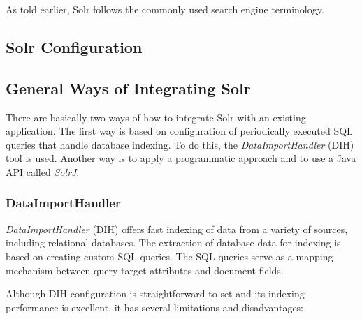 As told earlier, Solr follows the commonly used search engine terminology. 


\subsection{Solr Configuration}


\subsection{General Ways of Integrating Solr}

There are basically two ways of how to integrate Solr with an existing application. The first way is based on configuration of periodically executed SQL queries that handle database indexing. To do this, the \textit{DataImportHandler} (DIH) tool is used. Another way is to apply a programmatic approach and to use a Java API called \textit{SolrJ}.



\subsubsection{DataImportHandler}

\textit{DataImportHandler} (DIH) offers fast indexing of data from a variety of sources, including relational databases. 
The extraction of database data for indexing is based on creating custom SQL queries.
The SQL queries serve as a mapping mechanism between query target attributes and document fields.

Although DIH configuration is straightforward to set and its indexing performance is excellent, it has several limitations and disadvantages:

